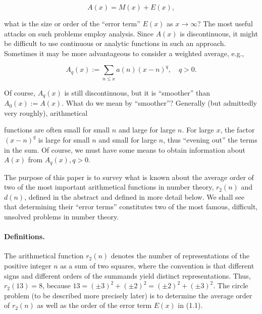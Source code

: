 \documentclass[10pt]{article}
\theoremstyle{plain}
\begin{document}
\begin{equation*}
A(x)=M(x)+E(x), \tag{1.1}
\end{equation*}


what is the size or order of the ``error term'' $E(x)$ as $x \to \infty$? The most useful attacks on such problems employ analysis. Since $A(x)$ is discontinuous, it might be difficult to use continuous or analytic functions in such an approach. Sometimes it may be more advantageous to consider a weighted average, e.g.,

$$
A_{q}(x):=\sum_{n \leq x} a(n)(x-n)^{q}, \quad q>0 .
$$

Of course, $A_{q}(x)$ is still discontinuous, but it is ``smoother'' than $A_{0}(x):=A(x)$. What do we mean by ``smoother''? Generally (but admittedly very roughly), arithmetical

\begingroup
\renewcommand{\thefootnote}{}
\endgroup
functions are often small for small $n$ and large for large $n$. For large $x$, the factor $(x-n)^{q}$ is large for small $n$ and small for large $n$, thus ``evening out'' the terms in the sum. Of course, we must have some means to obtain information about $A(x)$ from $A_{q}(x), q>0$.

The purpose of this paper is to survey what is known about the average order of two of the most important arithmetical functions in number theory, $r_{2}(n)$ and $d(n)$, defined in the abstract and defined in more detail below. We shall see that determining their ``error terms'' constitutes two of the most famous, difficult, unsolved problems in number theory.

\paragraph{Definitions.} The arithmetical function $r_{2}(n)$ denotes the number of representations of the positive integer $n$ as a sum of two squares, where the convention is that different signs and different orders of the summands yield distinct representations. Thus, $r_{2}(13)=8$, because $13=(\pm3)^{2}+(\pm2)^{2}=(\pm2)^{2}+(\pm3)^{2}$. The circle problem (to be described more precisely later) is to determine the average order of $r_{2}(n)$ as well as the order of the error term $E(x)$ in (1.1).
\end{document}
